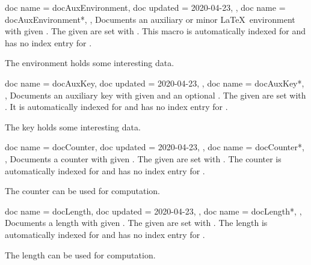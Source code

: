 \begin{docCommands}[doc parameter oarg marg={options}{name}]
  {
    {
      doc name    = docAuxEnvironment,
      doc updated = 2020-04-23,
    },
    {
      doc name = docAuxEnvironment*,
    },
  }
  Documents an auxiliary or minor \LaTeX\ environment with given .
  The given  are set with .
  This macro is automatically indexed for 
  and has no index entry for .
\begin{dispExample}
The environment  holds some interesting data.
\end{dispExample}
\end{docCommands}


\begin{docCommands}[doc parameter=\oarg{key path}\oarg{options}\marg{name}]
  {
    {
      doc name    = docAuxKey,
      doc updated = 2020-04-23,
    },
    {
      doc name = docAuxKey*,
    },
  }
  Documents an auxiliary key with given  and an optional .
  The given  are set with .
  It is automatically indexed for 
  and has no index entry for .
\begin{dispExample}
The key  holds some interesting data.
\end{dispExample}
\end{docCommands}



\begin{docCommands}[doc parameter oarg marg={options}{name}]
  {
    {
      doc name    = docCounter,
      doc updated = 2020-04-23,
    },
    {
      doc name = docCounter*,
    },
  }
  Documents a counter with given .
  The given  are set with .
  The counter is automatically indexed for 
  and has no index entry for .
\begin{dispExample}
The counter  can be used for computation.
\end{dispExample}
\end{docCommands}


\clearpage
\begin{docCommands}[doc parameter oarg marg={options}{name}]
  {
    {
      doc name    = docLength,
      doc updated = 2020-04-23,
    },
    {
      doc name = docLength*,
    },
  }
  Documents a length with given .
  The given  are set with .
  The length is automatically indexed for 
  and has no index entry for .
\begin{dispExample}
The length  can be used for computation.
\end{dispExample}
\end{docCommands}


